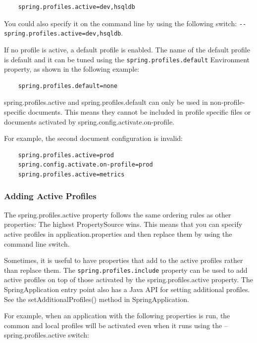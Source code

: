 \documentclass{scrartcl}
\begin{document}
\begin{lstlisting}
    spring.profiles.active=dev,hsqldb
\end{lstlisting}


You could also specify it on the command line by using the following switch: \lstinline|--spring.profiles.active=dev,hsqldb|.

If no profile is active, a default profile is enabled. The name of the default profile is default and it can be tuned using the \lstinline|spring.profiles.default| Environment property, as shown in the following example:


\begin{lstlisting}
    spring.profiles.default=none
\end{lstlisting}

spring.profiles.active and spring.profiles.default can only be used in non-profile-specific documents. This means they cannot be included in profile specific files or documents activated by spring.config.activate.on-profile.

For example, the second document configuration is invalid:

\begin{lstlisting}
    spring.profiles.active=prod
    spring.config.activate.on-profile=prod
    spring.profiles.active=metrics
\end{lstlisting}

\subsubsection{Adding Active Profiles}

The spring.profiles.active property follows the same ordering rules as other properties: The highest PropertySource wins. This means that you can specify active profiles in application.properties and then replace them by using the command line switch.

Sometimes, it is useful to have properties that add to the active profiles rather than replace them. The \lstinline|spring.profiles.include| property can be used to add active profiles on top of those activated by the spring.profiles.active property. The SpringApplication entry point also has a Java API for setting additional profiles. See the setAdditionalProfiles() method in SpringApplication.

For example, when an application with the following properties is run, the common and local profiles will be activated even when it runs using the --spring.profiles.active switch:
\end{document}
